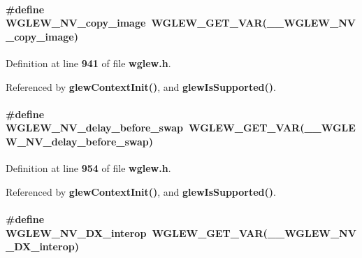 \paragraph[{W\+G\+L\+E\+W\+\_\+\+N\+V\+\_\+copy\+\_\+image}]{\setlength{\rightskip}{0pt plus 5cm}\#define W\+G\+L\+E\+W\+\_\+\+N\+V\+\_\+copy\+\_\+image~{\bf W\+G\+L\+E\+W\+\_\+\+G\+E\+T\+\_\+\+V\+AR}({\bf \+\_\+\+\_\+\+W\+G\+L\+E\+W\+\_\+\+N\+V\+\_\+copy\+\_\+image})}\label{wglew_8h_a0f44752ec1d1f478ade0c48a97755a0d}


Definition at line {\bf 941} of file {\bf wglew.\+h}.



Referenced by {\bf glew\+Context\+Init()}, and {\bf glew\+Is\+Supported()}.

\paragraph[{W\+G\+L\+E\+W\+\_\+\+N\+V\+\_\+delay\+\_\+before\+\_\+swap}]{\setlength{\rightskip}{0pt plus 5cm}\#define W\+G\+L\+E\+W\+\_\+\+N\+V\+\_\+delay\+\_\+before\+\_\+swap~{\bf W\+G\+L\+E\+W\+\_\+\+G\+E\+T\+\_\+\+V\+AR}({\bf \+\_\+\+\_\+\+W\+G\+L\+E\+W\+\_\+\+N\+V\+\_\+delay\+\_\+before\+\_\+swap})}\label{wglew_8h_a45d428a9d7f59803e55ea5e4e6241172}


Definition at line {\bf 954} of file {\bf wglew.\+h}.



Referenced by {\bf glew\+Context\+Init()}, and {\bf glew\+Is\+Supported()}.

\paragraph[{W\+G\+L\+E\+W\+\_\+\+N\+V\+\_\+\+D\+X\+\_\+interop}]{\setlength{\rightskip}{0pt plus 5cm}\#define W\+G\+L\+E\+W\+\_\+\+N\+V\+\_\+\+D\+X\+\_\+interop~{\bf W\+G\+L\+E\+W\+\_\+\+G\+E\+T\+\_\+\+V\+AR}({\bf \+\_\+\+\_\+\+W\+G\+L\+E\+W\+\_\+\+N\+V\+\_\+\+D\+X\+\_\+interop})}\label{wglew_8h_aedf3456a1e6a81931da75f19fc889ff3}


